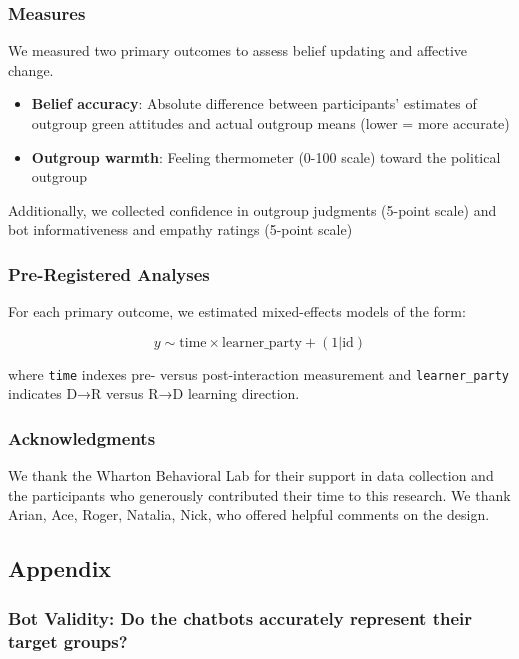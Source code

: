 \documentclass[
  11pt,
  oneside]{article}
\providecommand{\tightlist}{%
  \setlength{\itemsep}{0pt}\setlength{\parskip}{0pt}}\usepackage{longtable,booktabs,array}
\begin{document}
\subsubsection{Measures}\label{measures}

We measured two primary outcomes to assess belief updating and affective
change.

\begin{itemize}
\tightlist
\item
  \textbf{Belief accuracy}: Absolute difference between participants'
  estimates of outgroup green attitudes and actual outgroup means (lower
  = more accurate)
\item
  \textbf{Outgroup warmth}: Feeling thermometer (0-100 scale) toward the
  political outgroup
\end{itemize}

Additionally, we collected confidence in outgroup judgments (5-point
scale) and bot informativeness and empathy ratings (5-point scale)

\subsubsection{Pre-Registered Analyses}\label{pre-registered-analyses}

For each primary outcome, we estimated mixed-effects models of the form:

\[y \sim \text{time} \times \text{learner\_party} + (1 | \text{id})\]

where \texttt{time} indexes pre- versus post-interaction measurement and
\texttt{learner\_party} indicates D→R versus R→D learning direction.

\subsubsection{Acknowledgments}\label{acknowledgments}

We thank the Wharton Behavioral Lab for their support in data collection
and the participants who generously contributed their time to this
research. We thank Arian, Ace, Roger, Natalia, Nick, who offered helpful
comments on the design.

\subsection{Appendix}\label{appendix}

\subsubsection{Bot Validity: Do the chatbots accurately represent their
target
groups?}\label{bot-validity-do-the-chatbots-accurately-represent-their-target-groups}
\end{document}
